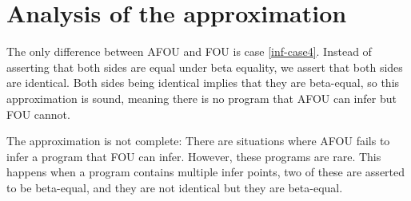 \section{Analysis of the approximation}
\label{analysing-inference}

The only difference between AFOU and FOU is case \ref{inf-case4}. Instead of asserting that both sides are equal under beta equality, we assert that both sides are identical. Both sides being identical implies that they are beta-equal, so this approximation is sound, meaning there is no program that AFOU can infer but FOU cannot. 

The approximation is not complete: There are situations where AFOU fails to infer a program that FOU can infer. However, these programs are rare. This happens when a program contains multiple infer points, two of these are asserted to be beta-equal, and they are not identical but they are beta-equal. 

\begin{comment}
\section{Analysis of the implementation}
\label{analysing-inference-impl}

This process of defining a rule for each constructor in the language is a bit tedious, and it easy to accidentally get wrong. Stratego (the transformation language of Spoofax) allows for \emph{generic term deconstruction} \cite{generictermdestr}, if Statix would also have this feature this would make writing the rules above in a generic way possible. Borrowing some of the syntax from Stratego, this would look like this:

\begin{lstlisting}
expectBetaEq((s1, e1@c#(xs)), (_, Infer(e2))) :-
	e2 == c#(<all(Infer)>(xs)),
	expectBetaEq((s1, e1), (sEmpty(), e2)).
\end{lstlisting}
\end{comment}



